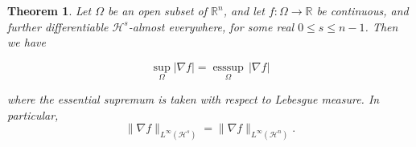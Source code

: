 \documentclass[10pt,a4paper]{amsart}
\newtheorem{theorem}{Theorem}
\DeclareMathOperator{\esssup}{esssup}
\begin{document}
\begin{theorem}\label{maintheorem}
Let $\Omega$ be an open subset of $\mathbb R^n$, and let $f: \Omega \to \mathbb R$ be continuous, and further differentiable $\mathcal H^s$-almost everywhere, for some real $0 \leq s \leq n-1$. Then we have

\begin{equation}\label{eq1}\sup_{\Omega} |\nabla f| = \underset{\Omega}{\esssup} \, |\nabla f|\end{equation}

\noindent where the essential supremum is taken with respect to Lebesgue measure. In particular,
\begin{equation}\label{eq2}\|\nabla f\|_{L^\infty (\mathcal H^s)} = \|\nabla f\|_{L^\infty(\mathcal H^n)}.\end{equation}
\end{theorem}
\end{document}
